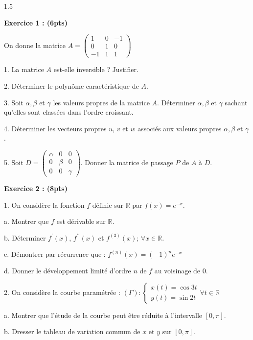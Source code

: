\documentclass[12pt]{article}
\begin{document}
\begin{spacing}{1.5}

\textbf{Exercice 1 : (6pts)}

On donne la matrice $ A= \begin{pmatrix}
1 & 0 & -1\\
0 & 1 & 0\\
-1 & 1 & 1
\end{pmatrix}$                                                                   

1. La matrice $A$ est-elle inversible ? Justifier.

2. Déterminer le polynôme caractéristique de $A$.

3. Soit $\alpha, \beta$ et $\gamma$ les valeurs propres de la matrice $A$. Déterminer $\alpha, \beta$ et $\gamma$ sachant qu'elles sont classées dans l'ordre croissant.

4. Déterminer les vecteurs propres $u$, $v$ et $w$ associés aux valeurs propres $\alpha, \beta$ et $\gamma$.

5. Soit $D=\begin{pmatrix}
\alpha & 0 & 0 \\ 
0 & \beta & 0 \\ 
0 & 0 & \gamma
\end{pmatrix} $. Donner la matrice de passage $P$ de $A$ à $D$.

\textbf{Exercice 2 : (8pts)}

1. On considère la fonction $f$ définie sur $\mathbb{R}$ par $f(x)=e^{-x}$.

a. Montrer que $f$ est dérivable sur $\mathbb{R}$.

b. Déterminer $f^\prime(x)$, $f^{\prime\prime}(x)$ et $f^{(3)}(x)$; $\forall {x}\in \mathbb{R}$.

c. Démontrer par récurrence que : $f^{(n)}(x)=(-1)^ne^{-x}$



d. Donner le développement limité d'ordre $n$ de $f$ au voisinage de $0$.

2. On considère la courbe paramétrée : $(\Gamma) :\begin{cases}
x(t)=\cos 3t\\
y(t)=\sin 2t
\end{cases} \forall t\in \mathbb{R}$

a. Montrer que l'étude de la courbe peut être réduite à l'intervalle $[0,\pi]$.

b. Dresser le tableau de variation commun de $x$ et $y$ sur $[0,\pi]$.


\end{spacing}
\end{document}
